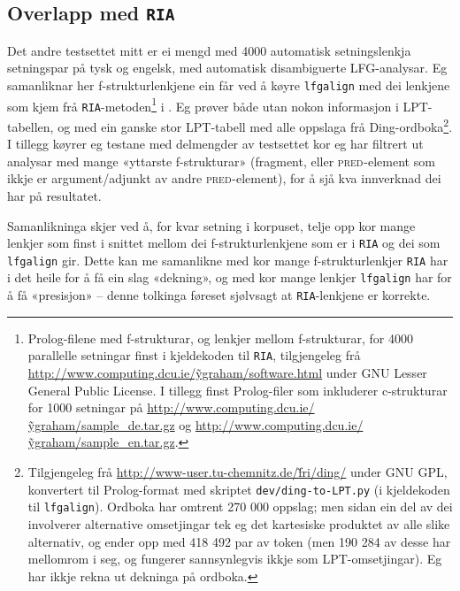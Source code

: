 \documentclass[12pt,a4paper,oneside,draft]{report}
\newcommand{\F}[2]{\textsc{#1}\ensuremath{_{#2}}}
\newcommand{\PRED}{\F{pred}{}}
\begin{document}
\subsection{Overlapp med \texttt{RIA}}
\label{sec-5.3.2}

\label{SEC:ria}

Det andre testsettet mitt er ei mengd med 4000 automatisk
 setningslenkja setningspar på tysk og engelsk, med automatisk
 disambiguerte LFG-analysar. Eg samanliknar her
 f\hyp{}strukturlenkjene ein får ved å køyre \texttt{lfgalign} med dei
 lenkjene som kjem frå \texttt{RIA}-metoden\footnote{Prolog-filene med f\hyp{}strukturar, og lenkjer mellom
        f\hyp{}strukturar, for 4000 parallelle setningar finst i
        kjeldekoden til \texttt{RIA}, tilgjengeleg frå
        \href{http://www.computing.dcu.ie/~ygraham/software.html}{http://www.computing.dcu.ie/\~ygraham/software.html} under GNU
        Lesser General Public License. I tillegg finst Prolog-filer
        som inkluderer c\hyp{}strukturar for 1000 setningar på
        \href{http://www.computing.dcu.ie/~ygraham/sample_de.tar.gz}{http://www.computing.dcu.ie/\~ygraham/sample\_de.tar.gz} og
        \href{http://www.computing.dcu.ie/~ygraham/sample_en.tar.gz}{http://www.computing.dcu.ie/\~ygraham/sample\_en.tar.gz}. } i
 \citet{graham2009osr,graham2009fts}. Eg prøver både utan nokon
 informasjon i LPT-tabellen, og med ein ganske stor LPT-tabell med
 alle oppslaga frå Ding-ordboka\footnote{Tilgjengeleg frå \href{http://www-user.tu-chemnitz.de/~fri/ding/}{http://www-user.tu-chemnitz.de/\~fri/ding/}
        under GNU GPL, konvertert til Prolog-format med skriptet
        \texttt{dev/ding-to-LPT.py} (i kjeldekoden til \texttt{lfgalign}).  Ordboka
        har omtrent 270 000 oppslag; men sidan ein del av dei
        involverer alternative omsetjingar tek eg det kartesiske
        produktet av alle slike alternativ, og ender opp med 418 492
        par av token (men 190 284 av desse har mellomrom i seg, og
        fungerer sannsynlegvis ikkje som LPT-omsetjingar). Eg har
        ikkje rekna ut dekninga på ordboka. }. I tillegg køyrer eg testane
 med delmengder av testsettet kor eg har filtrert ut analysar med
 mange «yttarste f\hyp{}strukturar» (fragment, eller
 \PRED{}\hyp{}element som ikkje er argument/adjunkt av andre
 \PRED{}\hyp{}element), for å sjå kva innverknad dei har på
 resultatet.

Samanlikninga skjer ved å, for kvar setning i korpuset, telje opp kor
 mange lenkjer som finst i snittet mellom dei f\hyp{}strukturlenkjene som
 er i \texttt{RIA} og dei som \texttt{lfgalign} gir. Dette kan me samanlikne med kor
 mange f\hyp{}strukturlenkjer \texttt{RIA} har i det heile for å få ein slag
 «dekning», og med kor mange lenkjer \texttt{lfgalign} har for å få
 «presisjon» -- denne tolkinga føreset sjølvsagt at \texttt{RIA}-lenkjene er
 korrekte.
\end{document}
